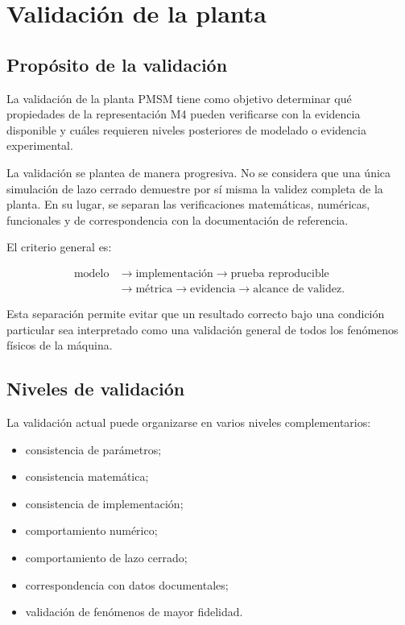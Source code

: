 \section{Validación de la planta}

\subsection{Propósito de la validación}

La validación de la planta PMSM tiene como objetivo determinar qué propiedades de la representación M4 pueden verificarse con la evidencia disponible y cuáles requieren niveles posteriores de modelado o evidencia experimental.

La validación se plantea de manera progresiva. No se considera que una única simulación de lazo cerrado demuestre por sí misma la validez completa de la planta. En su lugar, se separan las verificaciones matemáticas, numéricas, funcionales y de correspondencia con la documentación de referencia.

El criterio general es:

\begin{equation}
\begin{aligned}
\text{modelo}
&\rightarrow \text{implementación}
\rightarrow \text{prueba reproducible}
\\
&\rightarrow \text{métrica}
\rightarrow \text{evidencia}
\rightarrow \text{alcance de validez}.
\end{aligned}
\end{equation}

Esta separación permite evitar que un resultado correcto bajo una condición particular sea interpretado como una validación general de todos los fenómenos físicos de la máquina.

\subsection{Niveles de validación}

La validación actual puede organizarse en varios niveles complementarios:

\begin{itemize}
    \item consistencia de parámetros;
    \item consistencia matemática;
    \item consistencia de implementación;
    \item comportamiento numérico;
    \item comportamiento de lazo cerrado;
    \item correspondencia con datos documentales;
    \item validación de fenómenos de mayor fidelidad.
\end{itemize}

